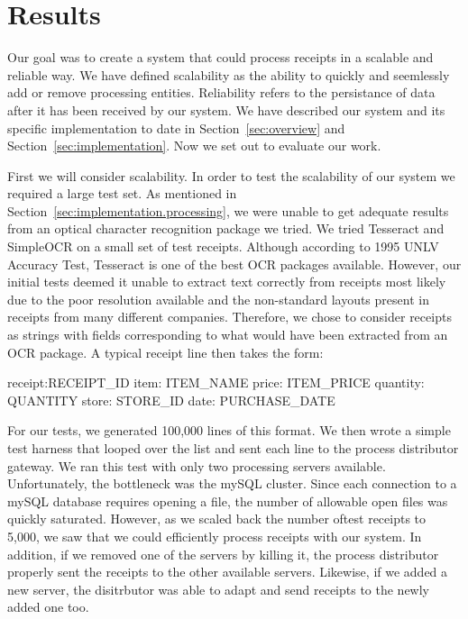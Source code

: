 \section{Results}
\label{sec:results}

Our goal was to create a system that could process receipts in a
scalable and reliable way. We have defined scalability as the ability
to quickly and seemlessly add or remove processing
entities. Reliability refers to the persistance of data after it has
been received by our system. We have described our system and its
specific implementation to date in Section~\ref{sec:overview} and
Section~\ref{sec:implementation}. Now we set out to evaluate our work.

First we will consider scalability. In order to test the scalability
of our system we required a large test set. As mentioned in
Section~\ref{sec:implementation.processing}, we were unable to get
adequate results from an optical character recognition package we
tried. We tried Tesseract and SimpleOCR on a small set of test
receipts. Although according to 1995 UNLV Accuracy Test, Tesseract is
one of the best OCR packages available. However, our initial tests
deemed it unable to extract text correctly from receipts most likely
due to the poor resolution available and the non-standard layouts
present in receipts from many different companies. Therefore, we chose to consider receipts as strings with fields corresponding to what would have been extracted from an OCR package. A typical receipt line then takes the form:
\begin{centering}
  {receipt:RECEIPT_ID} {item: ITEM_NAME} {price: ITEM_PRICE} {quantity: QUANTITY} {store: STORE_ID} {date: PURCHASE_DATE}
\end{centering}

For our tests, we generated 100,000 lines of this format. We then
wrote a simple test harness that looped over the list and sent each
line to the process distributor gateway. We ran this test with only
two processing servers available. Unfortunately, the bottleneck was
the mySQL cluster. Since each connection to a mySQL database requires
opening a file, the number of allowable open files was quickly
saturated. However, as we scaled back the number oftest receipts to
5,000, we saw that we could efficiently process receipts with our
system. In addition, if we removed one of the servers by killing it,
the process distributor properly sent the receipts to the other
available servers. Likewise, if we added a new server, the disitrbutor
was able to adapt and send receipts to the newly added one too.

